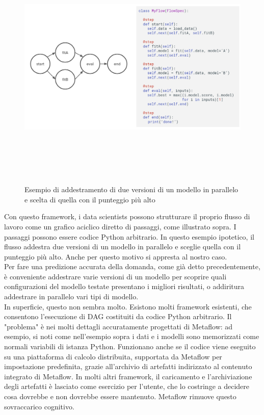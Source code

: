 \documentclass[12pt,a4paper]{report}
\begin{document}
\begin{figure}[h!]
    \begin{center}
        \includegraphics[width=12cm,height=12cm,keepaspectratio]{MetaFlow}
    \end{center}
    \caption{Esempio di addestramento di due versioni di un modello in parallelo e scelta di quella con il punteggio più alto}
    \label{fig:ex-MetaFlow}
\end{figure}

Con questo framework, i data scientists possono strutturare il proprio flusso di lavoro come un grafico aciclico diretto di passaggi, come illustrato sopra. I passaggi possono essere codice Python arbitrario. In questo esempio ipotetico, il flusso addestra due versioni di un modello in parallelo e sceglie quella con il punteggio più alto. Anche per questo motivo si appresta al nostro caso.\\
Per fare una predizione accurata della domanda, come già detto precedentemente, è conveniente addestrare varie versioni di un modello per scoprire quali configurazioni del modello testate presentano i migliori risultati, o addiritura addestrare in parallelo vari tipi di modello.\\
In superficie, questo non sembra molto. Esistono molti framework esistenti, che consentono l'esecuzione di DAG costituiti da codice Python arbitrario. Il "problema" è nei molti dettagli accuratamente progettati di Metaflow: ad esempio, si noti come nell'esempio sopra i dati e i modelli sono memorizzati come normali variabili di istanza Python. Funzionano anche se il codice viene eseguito su una piattaforma di calcolo distribuita, supportata da Metaflow per impostazione predefinita, grazie all'archivio di artefatti indirizzato al contenuto integrato di Metaflow. In molti altri framework, il caricamento e l'archiviazione degli artefatti è lasciato come esercizio per l'utente, che lo costringe a decidere cosa dovrebbe e non dovrebbe essere mantenuto. Metaflow rimuove questo sovraccarico cognitivo.
\end{document}
